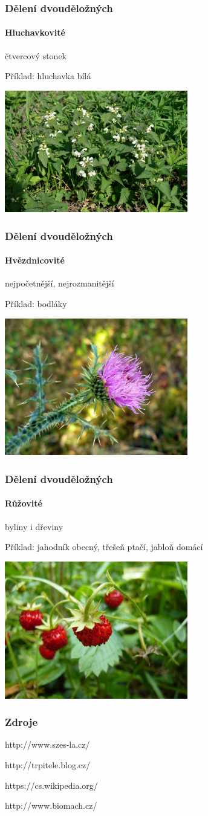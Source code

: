 \documentclass{beamer}
\begin{document}
\begin{frame}
\frametitle{Dělení dvouděložných}
	\framesubtitle{Hluchavkovité}čtvercový stonek

Příklad: hluchavka bílá

\begin{center}\includegraphics[width=8cm]{Hluchavka.jpg}\end{center}
\end{frame}
\begin{frame}
\frametitle{Dělení dvouděložných}
	\framesubtitle{Hvězdnicovité}nejpočetnější, nejrozmanitější

Příklad: bodláky

\begin{center}\includegraphics[width=8cm]{Carduus_acanthoides_syp_4.jpg}\end{center}
\end{frame}
\begin{frame}
\frametitle{Dělení dvouděložných}
	\framesubtitle{Růžovité}byliny i dřeviny

Příklad: jahodník obecný, třešeň ptačí, jabloň domácí

\begin{center}\includegraphics[width=8cm]{Fraise_des_bois.jpg}\end{center}
\end{frame}

\begin{frame}
\frametitle{Zdroje}

http://www.szes-la.cz/

http://trpitele.blog.cz/

https://cs.wikipedia.org/

http://www.biomach.cz/





\end{frame}
\end{document}
